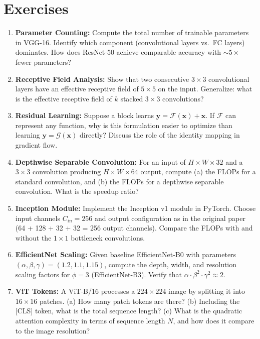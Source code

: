 \section{Exercises}

\begin{enumerate}
    \item \textbf{Parameter Counting:} Compute the total number of trainable parameters in VGG-16. Identify which component (convolutional layers vs.\ FC layers) dominates. How does ResNet-50 achieve comparable accuracy with $\sim5\times$ fewer parameters?

    \item \textbf{Receptive Field Analysis:} Show that two consecutive $3\times3$ convolutional layers have an effective receptive field of $5\times5$ on the input. Generalize: what is the effective receptive field of $k$ stacked $3\times3$ convolutions?

    \item \textbf{Residual Learning:} Suppose a block learns $\mathbf{y} = \mathcal{F}(\mathbf{x}) + \mathbf{x}$. If $\mathcal{F}$ can represent any function, why is this formulation easier to optimize than learning $\mathbf{y} = \mathcal{G}(\mathbf{x})$ directly? Discuss the role of the identity mapping in gradient flow.

    \item \textbf{Depthwise Separable Convolution:} For an input of $H\times W\times 32$ and a $3\times3$ convolution producing $H\times W\times 64$ output, compute (a) the FLOPs for a standard convolution, and (b) the FLOPs for a depthwise separable convolution. What is the speedup ratio?

    \item \textbf{Inception Module:} Implement the Inception v1 module in PyTorch. Choose input channels $C_{in}=256$ and output configuration as in the original paper (64 + 128 + 32 + 32 = 256 output channels). Compare the FLOPs with and without the $1\times1$ bottleneck convolutions.

    \item \textbf{EfficientNet Scaling:} Given baseline EfficientNet-B0 with parameters $(\alpha, \beta, \gamma) = (1.2, 1.1, 1.15)$, compute the depth, width, and resolution scaling factors for $\phi = 3$ (EfficientNet-B3). Verify that $\alpha\cdot\beta^2\cdot\gamma^2 \approx 2$.

    \item \textbf{ViT Tokens:} A ViT-B/16 processes a $224\times224$ image by splitting it into $16\times16$ patches. (a) How many patch tokens are there? (b) Including the [CLS] token, what is the total sequence length? (c) What is the quadratic attention complexity in terms of sequence length $N$, and how does it compare to the image resolution?
\end{enumerate}
